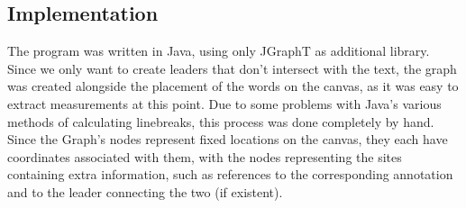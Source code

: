 \documentclass[11pt,a4paper]{article}
\begin{document}
\subsection{Implementation}
The program was written in Java, using only JGraphT\cite{JGraphT} as additional library. Since we only want to create leaders that don't intersect with the text, the graph was created alongside the placement of the words on the canvas, as it was easy to extract measurements at this point. Due to some problems with Java's various methods of calculating linebreaks, this process was done completely by hand. Since the Graph's nodes represent fixed locations on the canvas, they each have coordinates associated with them, with the nodes representing the sites containing extra information, such as references to the corresponding annotation and to the leader connecting the two (if existent).











\end{document}

